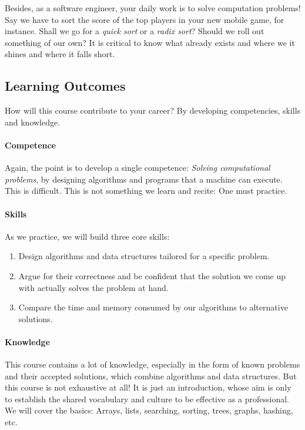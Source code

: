 \documentclass{aldast}
\begin{document}
Besides, as a software engineer, your daily work is to solve
computation problems! Say we have to sort the score of the top players
in your new mobile game, for instance. Shall we go for a \emph{quick
  sort} or a \emph{radix sort}?  Should we roll out something of our
own? It is critical to know what already exists and where we it shines
and where it falls short.


\subsection{Learning Outcomes}

How will this course contribute to your career? By
developing competencies, skills and knowledge.

\paragraph{Competence}
Again, the point is to develop a single competence: \emph{Solving
  computational problems}, by designing algorithms and programs that a
machine can execute. This is difficult. This is not something we learn
and recite: One must practice.

\paragraph{Skills}
As we practice, we will build three core skills:
\begin{enumerate}
\item Design algorithms and data structures tailored for a specific
  problem.
\item Argue for their correctness and be confident that the solution
  we come up with actually solves the problem at hand.
\item Compare the time and memory consumed by our algorithms to
  alternative solutions.
\end{enumerate}

\paragraph{Knowledge}
This course contains a lot of knowledge, especially in the form of
known problems and their accepted solutions, which combine algorithms
and data structures. But this course is not exhaustive at all! It is just
an introduction, whose aim is only to establish the shared vocabulary and
culture to be effective as a professional. We will cover the basics:
Arrays, lists, searching, sorting, trees, graphs, hashing, etc.
\end{document}
